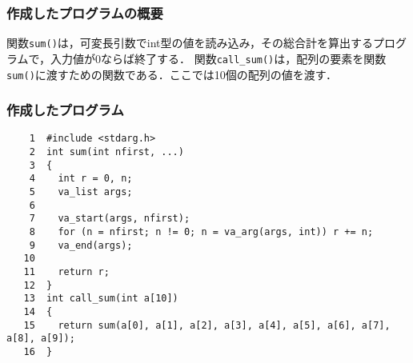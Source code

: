 \documentclass[a4j,11pt]{jarticle}
\begin{document}
  \subsubsection{作成したプログラムの概要}
  関数\verb|sum()|は，可変長引数でint型の値を読み込み，その総合計を算出するプログラムで，入力値が0ならば終了する．
  関数\verb|call_sum()|は，配列の要素を関数\verb|sum()|に渡すための関数である．ここでは10個の配列の値を渡す．
  \subsubsection{作成したプログラム}
  \begin{verbatim}
    1  #include <stdarg.h>
    2  int sum(int nfirst, ...)
    3  {
    4    int r = 0, n;
    5    va_list args;
    6
    7    va_start(args, nfirst);
    8    for (n = nfirst; n != 0; n = va_arg(args, int)) r += n;
    9    va_end(args);
   10
   11    return r;
   12  }
   13  int call_sum(int a[10])
   14  {
   15    return sum(a[0], a[1], a[2], a[3], a[4], a[5], a[6], a[7], a[8], a[9]);
   16  }
  \end{verbatim}
\end{document}
